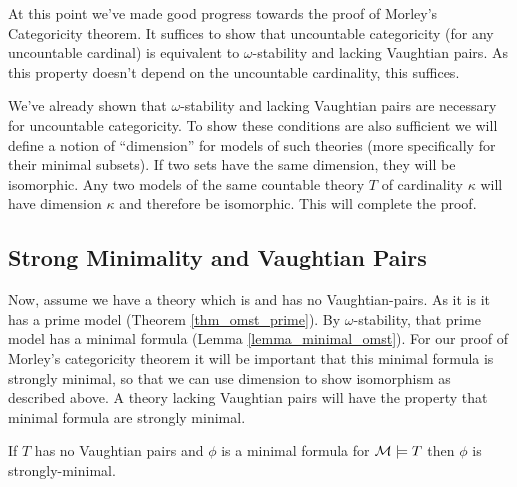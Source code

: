 At this point we've made good progress towards the proof of Morley's Categoricity theorem.
It suffices to show that uncountable categoricity (for any uncountable cardinal) is equivalent to \(\omega\)-stability and lacking Vaughtian pairs.
As this property doesn't depend on the uncountable cardinality, this suffices. 

We've already shown that \(\omega\)-stability and lacking Vaughtian pairs are necessary for uncountable categoricity.
To show these conditions are also sufficient we will define a notion of ``dimension'' for models of such theories (more specifically for their minimal subsets).
If two sets have the same dimension, they will be isomorphic.
Any two models of the same countable theory \(T\) of cardinality \(\kappa\) will have dimension \(\kappa\) and therefore be isomorphic.
This will complete the proof. 

\subsection{Strong Minimality and Vaughtian Pairs}

Now, assume we have a theory which is \omst and has no Vaughtian-pairs. 
As it is \omst it has a prime model (Theorem \ref{thm_omst_prime}).
By \(\omega\)-stability, that prime model has a minimal formula (Lemma \ref{lemma_minimal_omst}). 
For our proof of Morley's categoricity theorem it will be important that this minimal formula is strongly minimal, so that we can use dimension to show isomorphism as described above. 
A theory lacking Vaughtian pairs will have the property that minimal formula are strongly minimal. 

\begin{theorem}\label{theorem_minimal_vaughtian_pair}
If \(T\) has no Vaughtian pairs and \(\phi\) is a minimal formula for \(\mathcal{M} \models T\) then \(\phi\) is strongly-minimal. 
\end{theorem}

